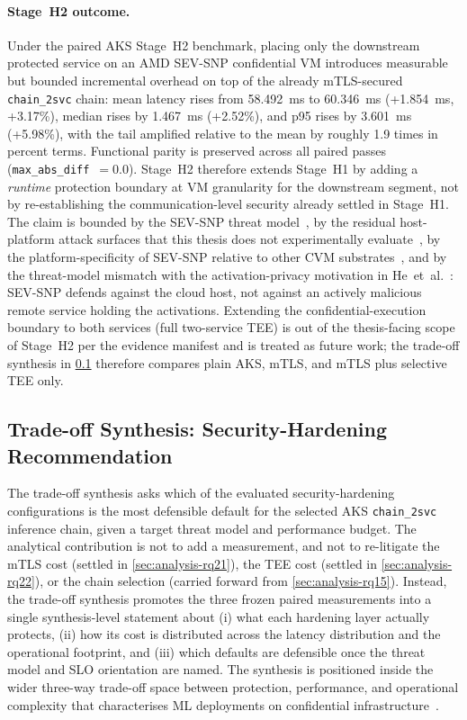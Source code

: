 \paragraph{Stage~H2 outcome.}
Under the paired AKS Stage~H2 benchmark, placing only the downstream
protected service on an AMD SEV-SNP confidential VM introduces
measurable but bounded incremental overhead on top of the already
mTLS-secured \texttt{chain\_2svc} chain: mean latency rises from
58.492~ms to 60.346~ms (+1.854~ms, +3.17\%), median rises by 1.467~ms
(+2.52\%), and p95 rises by 3.601~ms (+5.98\%), with the tail amplified
relative to the mean by roughly 1.9 times in percent terms. Functional
parity is preserved across all paired passes
(\texttt{max\_abs\_diff}~$=0.0$). Stage~H2 therefore extends Stage~H1 by
adding a \emph{runtime} protection boundary at VM granularity for the
downstream segment, not by re-establishing the communication-level
security already settled in Stage~H1. The claim is bounded by the SEV-SNP
threat model~\cite{amd_sevsnp_whitepaper}, by the residual
host-platform attack surfaces that this thesis does not experimentally
evaluate~\cite{schluter2024_heckler}, by the platform-specificity of
SEV-SNP relative to other CVM
substrates~\cite{guanciale2022_confidential_quartet}, and by the
threat-model mismatch with the activation-privacy motivation in
He~et~al.~\cite{he2021_attacking_collaborative}: SEV-SNP defends
against the cloud host, not against an actively malicious remote
service holding the activations. Extending the confidential-execution
boundary to both services (full two-service TEE) is out of the
thesis-facing scope of Stage~H2 per the evidence manifest and is treated
as future work; the trade-off synthesis in
\cref{sec:analysis-rq23} therefore compares plain AKS, mTLS, and mTLS
plus selective TEE only.

\subsection{Trade-off Synthesis: Security-Hardening Recommendation}
\label{sec:analysis-rq23}

The trade-off synthesis asks which of the evaluated security-hardening configurations is the
most defensible default for the selected AKS \texttt{chain\_2svc} inference
chain, given a target threat model and performance budget. The analytical
contribution is not to add a measurement, and not to re-litigate the mTLS
cost (settled in \cref{sec:analysis-rq21}), the TEE cost (settled in
\cref{sec:analysis-rq22}), or the chain selection (carried forward from
\cref{sec:analysis-rq15}). Instead, the trade-off synthesis promotes the three frozen paired
measurements into a single synthesis-level statement about (i) what each
hardening layer actually protects, (ii) how its cost is distributed across
the latency distribution and the operational footprint, and (iii) which
defaults are defensible once the threat model and SLO orientation are
named. The synthesis is positioned inside the wider three-way trade-off
space between protection, performance, and operational complexity that
characterises ML deployments on confidential
infrastructure~\cite{mo2024_ml_confidential_computing}.


